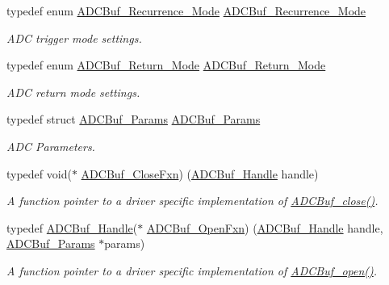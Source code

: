 \begin{DoxyCompactItemize}
typedef enum \hyperlink{_a_d_c_buf_8h_af15cc4961b02af48216132c2b8bc88f1}{A\+D\+C\+Buf\+\_\+\+Recurrence\+\_\+\+Mode} \hyperlink{_a_d_c_buf_8h_a56e923d70f15e00c78a7c730d7112e4d}{A\+D\+C\+Buf\+\_\+\+Recurrence\+\_\+\+Mode}
\begin{DoxyCompactList}\small\item\em A\+D\+C trigger mode settings. \end{DoxyCompactList}\item 
typedef enum \hyperlink{_a_d_c_buf_8h_a3d643e8024503c5ef2679c83419ba6ee}{A\+D\+C\+Buf\+\_\+\+Return\+\_\+\+Mode} \hyperlink{_a_d_c_buf_8h_a12018234e9f4c347c3416592cdb113ef}{A\+D\+C\+Buf\+\_\+\+Return\+\_\+\+Mode}
\begin{DoxyCompactList}\small\item\em A\+D\+C return mode settings. \end{DoxyCompactList}\item 
typedef struct \hyperlink{struct_a_d_c_buf___params}{A\+D\+C\+Buf\+\_\+\+Params} \hyperlink{_a_d_c_buf_8h_aa25bdf18217501abe1581cf2a1a795b0}{A\+D\+C\+Buf\+\_\+\+Params}
\begin{DoxyCompactList}\small\item\em A\+D\+C Parameters. \end{DoxyCompactList}\item 
typedef void($\ast$ \hyperlink{_a_d_c_buf_8h_a94dfd94e96f6c7e15a9da57feddd60dc}{A\+D\+C\+Buf\+\_\+\+Close\+Fxn}) (\hyperlink{_a_d_c_buf_8h_a9b9646efcf7a7fd38a2935abd940cf96}{A\+D\+C\+Buf\+\_\+\+Handle} handle)
\begin{DoxyCompactList}\small\item\em A function pointer to a driver specific implementation of \hyperlink{_a_d_c_buf_8h_a04ab5fae5da8f9ff77ab3ae4974d8f7d}{A\+D\+C\+Buf\+\_\+close()}. \end{DoxyCompactList}\item 
typedef \hyperlink{_a_d_c_buf_8h_a9b9646efcf7a7fd38a2935abd940cf96}{A\+D\+C\+Buf\+\_\+\+Handle}($\ast$ \hyperlink{_a_d_c_buf_8h_ae6db2b63af06cf407f74c7d7779eb391}{A\+D\+C\+Buf\+\_\+\+Open\+Fxn}) (\hyperlink{_a_d_c_buf_8h_a9b9646efcf7a7fd38a2935abd940cf96}{A\+D\+C\+Buf\+\_\+\+Handle} handle, \hyperlink{struct_a_d_c_buf___params}{A\+D\+C\+Buf\+\_\+\+Params} $\ast$params)
\begin{DoxyCompactList}\small\item\em A function pointer to a driver specific implementation of \hyperlink{_a_d_c_buf_8h_a0b63bca2e8f8e5b58f0c657ac662c97b}{A\+D\+C\+Buf\+\_\+open()}. \end{DoxyCompactList}\item 

\end{DoxyCompactItemize}
